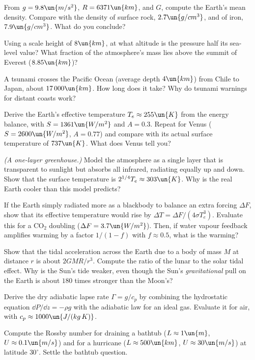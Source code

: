 \begin{problems}
\core From $g = 9.8\un{m/s^2}$, $R = 6371\un{km}$, and $G$, compute the Earth's mean density. Compare with the density of surface rock, $2.7\un{g/cm^3}$, and of iron, $7.9\un{g/cm^3}$. What do you conclude?

 Using a scale height of $8\un{km}$, at what altitude is the pressure half its sea-level value? What fraction of the atmosphere's mass lies above the summit of Everest ($8.85\un{km}$)?

 A tsunami crosses the Pacific Ocean (average depth $4\un{km}$) from Chile to Japan, about $17\,000\un{km}$. How long does it take? Why do tsunami warnings for distant coasts work?

\core Derive the Earth's effective temperature $T_e\approx255\un{K}$ from the energy balance, with $S = 1361\un{W/m^2}$ and $A = 0.3$. Repeat for Venus ($S = 2600\un{W/m^2}$, $A = 0.77$) and compare with its actual surface temperature of $737\un{K}$. What does Venus tell you?

 \emph{(A one-layer greenhouse.)} Model the atmosphere as a single layer that is transparent to sunlight but absorbs all infrared, radiating equally up and down. Show that the surface temperature is $2^{1/4}T_e\approx303\un{K}$. Why is the real Earth cooler than this model predicts?

\core \label{prob:no-feedback} If the Earth simply radiated more as a blackbody to balance an extra forcing $\Delta F$, show that its effective temperature would rise by $\Delta T = \Delta F/(4\sigma T_e^3)$. Evaluate this for a CO$_2$ doubling ($\Delta F = 3.7\un{W/m^2}$). Then, if water vapour feedback amplifies warming by a factor $1/(1-f)$ with $f\approx0.5$, what is the warming?

\core \label{prob:tides} Show that the tidal acceleration across the Earth due to a body of mass $M$ at distance $r$ is about $2GMR/r^3$. Compute the ratio of the lunar to the solar tidal effect. Why is the Sun's tide weaker, even though the Sun's \emph{gravitational} pull on the Earth is about $180$ times stronger than the Moon's?

 Derive the dry adiabatic lapse rate $\Gamma = g/c_p$ by combining the hydrostatic equation $\dd P/\dd z = -\rho g$ with the adiabatic law for an ideal gas. Evaluate it for air, with $c_p\approx1000\un{J/(kg\,K)}$.

 Compute the Rossby number for draining a bathtub ($L\approx1\un{m}$, $U\approx0.1\un{m/s}$) and for a hurricane ($L\approx500\un{km}$, $U\approx30\un{m/s}$) at latitude $30^\circ$. Settle the bathtub question.


\end{problems}
